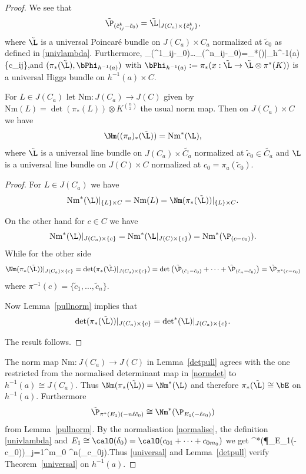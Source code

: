 \begin{proof}
	We see that $$\tilde{\P}_{(\tilde{c}^{k}_{ij}-\tilde{c}_0)}=\tilde{\L}|_{J(C_a)\times \{\tilde{c}^{k}_{ij}\}},$$ where $\tilde{\L}$ is a universal Poincar\'e bundle on $J(C_a)\times C_a$ normalized at $\tilde{c}_0$ as defined in \eqref{univlambda}. Furthermore, \beq\label{universal}\tilde{\P}_{(^{1}_{ij}-_0)}\oplus \dots \oplus \tilde{\P}_{(^{n}_{ij}-_0)}=\pi_*(\tilde{\L})|_{h^{-1}(a)\times\{c_{ij}\}},\eeq and $(\pi_*(\tilde{\L}),\bPhi_{h^{-1}(a)})$ with $\bPhi_{h^{-1}(a)}:=\pi_*(x:\tilde{\L}\to \tilde{\L}\otimes \pi^*(K))$ is a universal Higgs bundle on $h^{-1}(a)\times C$.

	\begin{lemma}
\notready\label{detpull} For  $L\in J(C_a)$ let ${\mathrm{Nm}}:J(C_a)\to J(C)$ given by ${\mathrm{Nm}}(L)=\det(\pi_*(L))\otimes K^{n\choose 2}$ the usual norm map. Then on $J(C_a)\times C$  we have $$\Nm((\pi_a)_*(\tilde{\L}))={\mathrm{Nm}}^*(\L),$$ where $\tilde{\L}$ is a universal line bundle on $J(C_a)\times \tilde{C_a}$ normalized at $\tilde{c}_0\in \tilde{C_a}$ and $\L$ is a universal line bundle on $J(C)\times C$ normalized at $c_0=\pi_a(\tilde{c}_0)$.
	\end{lemma}
	\begin{proof} For  $L\in J(C_a)$ we have $${\mathrm{Nm}}^*(\L)|_{\{L\}\times C}={\mathrm{Nm}}(L)=\Nm(\pi_*(\tilde{\L}))|_{\{L\}\times C}
		.$$

		On the other hand for $c\in C$ we have $${\mathrm{Nm}}^*(\L)|_{J(C_a)\times\{c\} }={\mathrm{Nm}}^*(\L|_{J(C)\times\{c\}})={\mathrm{Nm}}^*(\P_{(c-c_0)}).$$
		While for the other side $$\Nm(\pi_*(\tilde{\L}))|_{J(C_a)\times\{c\} }=\det(\pi_*(\tilde{\L})|_{J(C_a)\times\{c\} })=\det\left(\tilde{\P}_{(\tilde{c}_1-\tilde{c}_0)}+\dots+\tilde{\P}_{(\tilde{c}_n-\tilde{c}_0)}\right)=\tilde{\P}_{\pi^*(c-c_0)}$$ where $\pi^{-1}(c)=\{\tilde{c}_1,\dots,\tilde{c}_n\}$.

		Now Lemma~\ref{pullnorm} implies that  $$\det(\pi_*(\tilde{\L}))|_{J(C_a)\times\{c\} }= {\rm det}^*(\L)|_{J(C_a)\times\{c\} }.$$

		The result follows.
	\end{proof}
	The norm map ${\mathrm{Nm}}:J(C_a)\to J(C)$ in Lemma~\ref{detpull} agrees with the one restricted from
	the normalised determinant map in \eqref{normdet} to $h^{-1}(a)\cong J(C_a)$. Thus $\Nm(\pi_*(\tilde{\L}))=\Nm^*({\L})$ and therefore  $\pi_*(\tilde{\L})\cong \bE$ on $h^{-1}(a)$. Furthermore $$ \tilde{\P}_{\pi^*(E_1)(-n\ell \tilde{c}_0)}\cong \Nm^*(\P_{E_1(-\ell c_0)})$$ from Lemma~\ref{pullnorm}. By the normalisation \eqref{normalise}, the definition \eqref{univlambda} and $E_1\cong\calO(\delta_0)=\calO(c_{01}+\dots+c_{0m_0})$   we get \beq\label{normdeterminant}\Nm^*(\P_{E_1(-\ell c_0)})\cong \bigotimes_{j=1}^{m_0} \Lambda^{n}(\bE_{c_{0j}}).\eeq Thus \eqref{universal} and Lemma~\ref{detpull} verify Theorem~\ref{universal} on $h^{-1}(a)$.


\end{proof}
